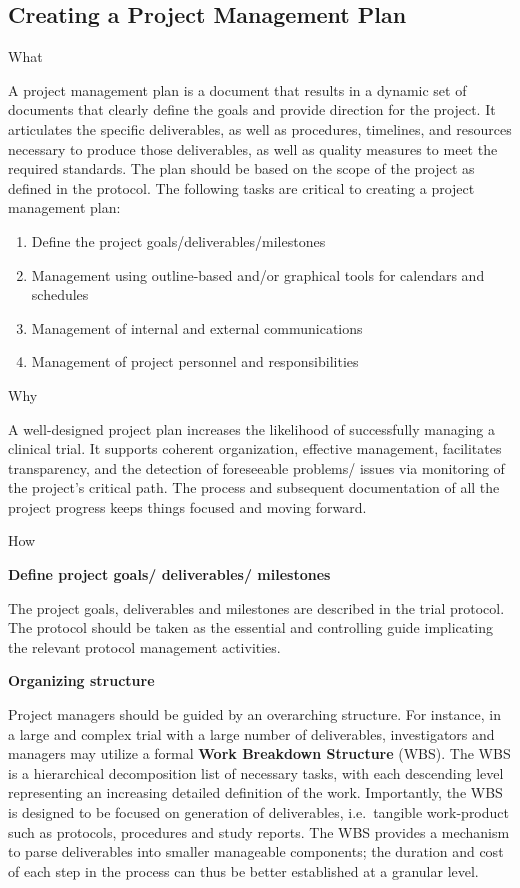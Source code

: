 \documentclass[]{book}
\begin{document}
\subsection{Creating a Project Management
Plan}\label{creating-a-project-management-plan}

What

A project management plan is a document that results in a dynamic set of
documents that clearly define the goals and provide direction for the
project. It articulates the specific deliverables, as well as
procedures, timelines, and resources necessary to produce those
deliverables, as well as quality measures to meet the required
standards. The plan should be based on the scope of the project as
defined in the protocol. The following tasks are critical to creating a
project management plan:

\begin{enumerate}
\def\labelenumi{\arabic{enumi}.}
\item
  Define the project goals/deliverables/milestones
\item
  Management using outline-based and/or graphical tools for calendars
  and schedules
\item
  Management of internal and external communications
\item
  Management of project personnel and responsibilities
\end{enumerate}

Why

A well-designed project plan increases the likelihood of successfully
managing a clinical trial. It supports coherent organization, effective
management, facilitates transparency, and the detection of foreseeable
problems/ issues via monitoring of the project's critical path. The
process and subsequent documentation of all the project progress keeps
things focused and moving forward.

How

\textbf{Define project goals/ deliverables/ milestones}

The project goals, deliverables and milestones are described in the
trial protocol. The protocol should be taken as the essential and
controlling guide implicating the relevant protocol management
activities.

\textbf{Organizing structure}

Project managers should be guided by an overarching structure. For
instance, in a large and complex trial with a large number of
deliverables, investigators and managers may utilize a formal
\textbf{Work Breakdown Structure} (WBS). The WBS is a hierarchical
decomposition list of necessary tasks, with each descending level
representing an increasing detailed definition of the work. Importantly,
the WBS is designed to be focused on generation of deliverables,
i.e.~tangible work-product such as protocols, procedures and study
reports. The WBS provides a mechanism to parse deliverables into smaller
manageable components; the duration and cost of each step in the process
can thus be better established at a granular level.
\end{document}
